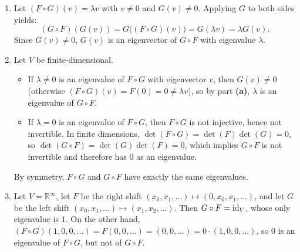\begin{exercisesolution}
\label{sol:eigenvalues_of_composed_endomorphisms}
\begin{enumerate}[label=\textbf{(\alph*)}]
    \item Let $(F \circ G)(v) = \lambda v$ with $v \ne 0$ and $G(v) \ne 0$.
    Applying $G$ to both sides yields:
    \[
    (G \circ F)(G(v)) = G\big((F \circ G)(v)\big) = G(\lambda v) = \lambda G(v).
    \]
    Since $G(v) \ne 0$, $G(v)$ is an eigenvector of $G \circ F$ with eigenvalue $\lambda$.

    \item Let $V$ be finite-dimensional.
    \begin{itemize}
        \item If $\lambda \ne 0$ is an eigenvalue of $F \circ G$ with eigenvector $v$, then $G(v) \ne 0$ (otherwise $(F \circ G)(v) = F(0) = 0 \ne \lambda v$), so by part \textbf{(a)}, $\lambda$ is an eigenvalue of $G \circ F$.
        \item If $\lambda = 0$ is an eigenvalue of $F \circ G$, then $F \circ G$ is not injective, hence not invertible. In finite dimensions, $\det(F \circ G) = \det(F) \det(G) = 0$, so $\det(G \circ F) = \det(G) \det(F) = 0$, which implies $G \circ F$ is not invertible and therefore has $0$ as an eigenvalue.
    \end{itemize}
    By symmetry, $F \circ G$ and $G \circ F$ have exactly the same eigenvalues.

    \item Let $V = \mathbb{R}^\infty$, let $F$ be the right shift $(x_0, x_1, \dots) \mapsto (0, x_0, x_1, \dots)$, and let $G$ be the left shift $(x_0, x_1, \dots) \mapsto (x_1, x_2, \dots)$.
    Then $G \circ F = \operatorname{id}_V$, whose only eigenvalue is $1$.
    On the other hand, $(F \circ G)(1, 0, 0, \dots) = F(0, 0, \dots) = (0, 0, \dots) = 0 \cdot (1, 0, 0, \dots)$, so $0$ is an eigenvalue of $F \circ G$, but not of $G \circ F$. \qedhere
\end{enumerate}
\end{exercisesolution}

